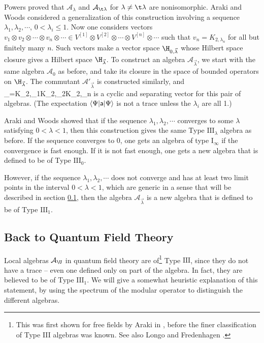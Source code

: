 \documentclass[12pt]{article}
\def\I{{\mathrm I}}
\def\III{{\mathrm{ III}}}
\def\a{{\sf a}}
\def\nn{{[n]}}
\def\oone{{[1]}}
\def\ttwo{{[2]}}
\def\ra{\rangle}
\def\la{\langle}
\numberwithin{equation}{section}
\def\A{{\mathcal A}}
\begin{document}
 Powers 
\cite{Powers} proved that $\A_\lambda$ and $\A_{\t\lambda}$ for $\lambda\not=\t\lambda$ are nonisomorphic.
Araki and Woods \cite{ArakiWoods} considered a generalization of this construction involving a sequence
$\lambda_1,\lambda_2,\cdots$, $0<\lambda_i\leq 1$.     Now one considers vectors
$v_1\otimes v_2\otimes \cdots \otimes v_n\otimes \cdots\in
V^\oone\otimes V^\ttwo \otimes \cdots \otimes V^\nn\otimes \cdots$  such that $v_n=K_{2,\lambda_n}$ for
all but finitely many $n$.  Such vectors make a vector space $\H_{0,\vec\lambda}$ whose Hilbert space closure
 gives a Hilbert space $\H_{\vec\lambda}$.   To construct an algebra $\A_{\vec \lambda}$, we start
with the same algebra $\A_0$ as before, and take its closure in the space of bounded operators on
$\H_{\vec\lambda}$.   The commutant $\A'_{\vec\lambda}$ is constructed similarly, and
\be\label{murfy}\Psi_{\vec\lambda}=K_{2,\lambda_1}\otimes K_{2,\lambda_2}\otimes \cdots \otimes K_{2,\lambda_n}\otimes \cdots \ee
is a cyclic and separating vector for this pair of algebras. (The expectation $\la\Psi|\a|\Psi\ra$ is not a trace
unless the $\lambda_i$ are all 1.)

Araki and Woods \cite{ArakiWoods}
showed that if the sequence $\lambda_1,\lambda_2,\cdots $ converges to some $\lambda$
satisfying $0<\lambda<1$, then this construction gives the same Type $\III_\lambda$ algebra as before.  If the
sequence converges to 0, one gets an algebra of type $\I_\infty$ if the convergence is fast enough. If it is not 
fast enough,
one gets a new algebra that is defined to be of Type $\III_0$. 

However, if the sequence $\lambda_1,\lambda_2,\cdots$ does not converge and has at least two limit points in the
interval $0<\lambda<1$, which are generic in a sense that will be described in section \ref{backqft},
 then the algebra $\A_{\vec \lambda}$ is a new algebra that is defined to be of Type $\III_1$.
 
\subsection{Back to Quantum Field Theory}\label{backqft}

Local algebras $\A_\U$ in quantum field theory are of\footnote{This was first shown for free fields by Araki in \cite{ArakiFree}, before the  finer
classification of Type III algebras was known.  See also Longo \cite{LongoKingston} and Fredenhagen \cite{Fredenhagen}.} Type $\III$, since they do not 
 have a trace -- even one defined only on part of the algebra.  In fact, they are believed to be of  Type $\III_1$.   We will give a somewhat heuristic explanation of this statement, by using the spectrum of the modular operator to distinguish
the different algebras.
\end{document}
